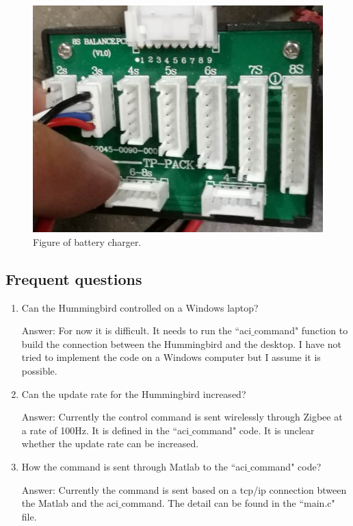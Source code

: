 \documentclass[idxtotoc,hyperref,openany]{labbook} %
\begin{document}
\begin{figure}
\centering
\includegraphics[scale=0.5]{./Figure/fig_charge}
\caption{Figure of battery charger.}\label{fig_charge}
\end{figure}
\subsection{Frequent questions}
\begin{enumerate}
\item Can the Hummingbird controlled on a Windows laptop?

Answer: For now it is difficult. It needs to run the ``aci$\_$command" function to build the connection between the Hummingbird and the desktop. I have not tried to implement the code on a Windows computer but I assume it is possible. 

\item Can the update rate for the Hummingbird increased?

Answer: Currently the control command is sent wirelessly through Zigbee at a rate of 100Hz. It is defined in the ``aci$\_$command" code. It is unclear whether the update rate can be increased. 

\item How the command is sent through Matlab to the ``aci$\_$command" code?

Answer: Currently the command is sent based on a tcp/ip connection btween the Matlab and the aci$\_$command. The detail can be found in the ``main.c" file. 
\end{enumerate}
\newpage
\end{document}
